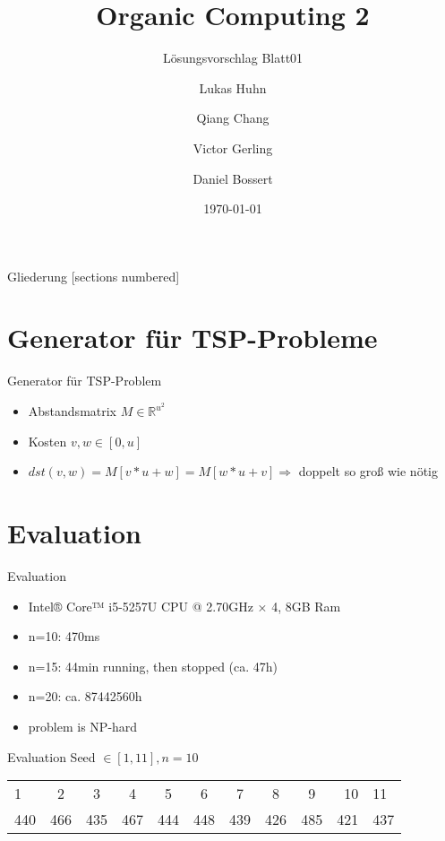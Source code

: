 \documentclass{ocbeameruni}
\title{Organic Computing 2}
\subtitle{Lösungsvorschlag Blatt01}
\date{\today}
\author{Lukas Huhn \and Qiang Chang \and Victor Gerling \and Daniel Bossert}
\institute{%
  Universität Augsburg\\
  Institut für Informatik\\
  Lehrstuhl für Organic Computing
}
\newcommand{\R}{\mathbb{R}}
\begin{document}
\maketitle


\begin{frame}{Gliederung}
  [sections numbered]
  \tableofcontents
\end{frame}


\section{Generator für TSP-Probleme}

\begin{frame}{Generator für TSP-Problem}
    \begin{itemize}
    \item Abstandsmatrix $M \in {\R}^{u^{2}}$
    \item Kosten $v,w \in [0,u]$
    \item $dst(v,w) = M[v*u+w] = M[w*u+v] \Rightarrow$ 
    doppelt so groß wie nötig
    \end{itemize}
\end{frame}


\section{Evaluation}

\begin{frame}{Evaluation}
    \begin{itemize}
        \item Intel® Core™ i5-5257U CPU @ 2.70GHz × 4, 8GB Ram
        \item n=10: 470ms 
        \item n=15: 44min running, then stopped (ca. 47h)
        \item n=20: ca. 87442560h
        \item problem is NP-hard
    \end{itemize}
\end{frame}


\begin{frame}{Evaluation Seed $\in [1,11], n=10$ }
\begin{tabular}{ l | c | c |c |c |c |c |c | c |r }
   1 & 2 & 3 & 4 & 5 & 6 & 7 & 8 & 9 & 10 & 11  \\
   440 & 466 & 435 & 467 & 444 & 448 & 439 & 426 & 485 & 421 & 437 \\
\end{tabular}
\end{frame}
\end{document}
